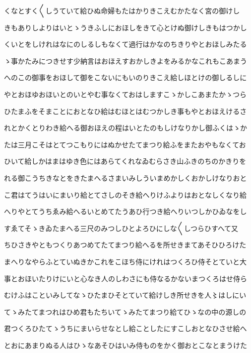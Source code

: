 \documentclass[a4paper,11pt,landscape]{ltjtarticle}
\begin{document}
くなとすく〱しうていて給ひぬ命婦もたはかりきこえむかたなく宮の御けし
\par\medskip
きもありしよりはいとゝうきふしにおほしをきて心とけぬ御けしきもはつかし
\par\medskip
くいとをしけれはなにのしるしもなくて過行はかなのちきりやとおほしみたる
\par\medskip
ゝ事かたみにつきせす少納言はおほえすおかしきよをみるかなこれもこあまう
\par\medskip
へのこの御事をおほして御をこないにもいのりきこえ給しほとけの御しるしに
\par\medskip
やとおほゆおほいとのいとやむ事なくておはしますこゝかしこあまたかゝつら
\par\medskip
ひたまふをそまことにおとなひ給はむほとはむつかしき事もやとおほえけるさ
\par\medskip
れとかくとりわき給へる御おほえの程はいとたのもしけなりかし御ふくはゝか
\par\medskip
たは三月こそはとてつこもりにはぬかせたてまつり給ふをまたおやもなくてお
\par\medskip
ひいて給しかはまはゆき色にはあらてくれなゐむらさき山ふきのちのかきりを
\par\medskip
れる御こうちきなとをきたまへるさまいみしういまめかしくおかしけなりおと
\par\medskip
こ君はてうはいにまいり給とてさしのそき給へりけふよりはおとなしくなり給
\par\medskip
へりやとてうちゑみ給へるいとめてたうあひ行つき給へりいつしかひゐなをし
\par\medskip
すゑてそゝきゐたまへる三尺のみつしひとよろひにしな〱しつらひすへて又
\par\medskip
ちひさきやともつくりあつめてたてまつり給へるを所せきまてあそひひろけた
\par\medskip
まへりなやらふとていぬきかこれをこほち侍にけれはつくろひ侍そとていと大
\par\medskip
事とおほいたりけにいと心なき人のしわさにも侍なるかないまつくろはせ侍ら
\par\medskip
むけふはこといみしてなゝひたまひそとていて給けしき所せきを人〻はしにい
\par\medskip
てゝみたてまつれはひめ君もたちいてゝみたてまつり給てひゝなの中の源しの
\par\medskip
君つくろひたてゝうちにまいらせなとし給ことしたにすこしおとなひさせ給へ
\par\medskip
とおにあまりぬる人はひゝなあそひはいみ侍ものをかく御おとこなとまうけた
\par\medskip
\end{document}
